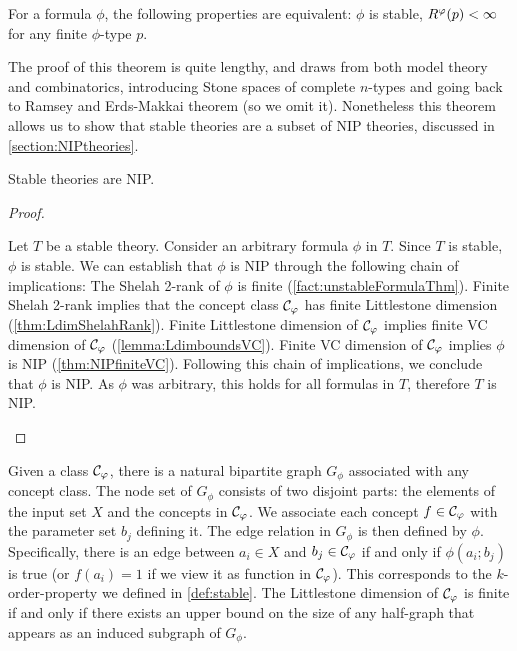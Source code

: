 \begin{fact}
\label{fact:unstableFormulaThm}
\begin{outline}
\0 For a formula $\phi$, the following properties are equivalent:
    \1 $\phi$ is stable,
    \1 $R^\varphi(p) < \infty$ for any finite $\phi$-type $p$.
\end{outline}
\end{fact}

The proof of this theorem is quite lengthy, and draws from both model theory and combinatorics, introducing Stone spaces of complete $n$-types and going back to Ramsey and Erds-Makkai theorem (so we omit it). Nonetheless this theorem allows us to show that stable theories are a subset of NIP theories, discussed in \cref{section:NIPtheories}.

\begin{theorem}
    Stable theories are NIP.
\end{theorem}
\begin{proof}
\begin{outline}
\0 Let $T$ be a stable theory. Consider an arbitrary formula $\phi$ in $T$. Since $T$ is stable, $\phi$ is stable. We can establish that $\phi$ is NIP through the following chain of implications:
    \1[1)] The Shelah 2-rank of $\phi$ is finite (\cref{fact:unstableFormulaThm}).
    \1[2)] Finite Shelah 2-rank implies that the concept class $\mathcal{C}_\varphi$ has finite Littlestone dimension (\cref{thm:LdimShelahRank}).
    \1[2)] Finite Littlestone dimension of $\mathcal{C}_\varphi$ implies finite VC dimension of $\mathcal{C}_\varphi$ (\cref{lemma:LdimboundsVC}).
    \1[3)] Finite VC dimension of $\mathcal{C}_\varphi$ implies $\phi$ is NIP (\cref{thm:NIPfiniteVC}).
\0 Following this chain of implications, we conclude that $\phi$ is NIP. As $\phi$ was arbitrary, this holds for all formulas in $T$, therefore $T$ is NIP.
\end{outline}
\end{proof}


\begin{remark}
    Given a class $\mathcal{C}_\varphi$, there is a natural bipartite graph $G_\phi$ associated with any concept class. The node set of $G_\phi$ consists of two disjoint parts: the elements of the input set $X$ and the concepts in $\mathcal{C}_\varphi$. We associate each concept $f\in\mathcal{C}_\varphi$ with the parameter set $b_j$ defining it. The edge relation in $G_\phi$ is then defined by $\phi$. Specifically, there is an edge between $a_i\in X$ and $b_j\in\mathcal{C}_\varphi$ if and only if $\phi(a_i;b_j)$ is true (or $f(a_i)=1$ if we view it as function in $\mathcal{C}_\varphi$).
    This corresponds to the $k$-order-property we defined in \cref{def:stable}. The Littlestone dimension of $\mathcal{C}_\varphi$ is finite if and only if there exists an upper bound on the size of any half-graph that appears as an induced subgraph of $G_\phi$. 
\end{remark}

